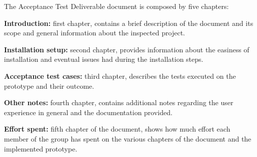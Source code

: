 The Acceptance Test Deliverable document is composed by five chapters:

\textbf{Introduction:} first chapter, contains a brief description of the document and its scope and general information about the inspected project.

\textbf{Installation setup:} second chapter, provides information about the easiness of installation and eventual issues had during the installation steps.

\textbf{Acceptance test cases:} third chapter, describes the tests executed on the prototype and their outcome.

\textbf{Other notes:} fourth chapter, contains additional notes regarding the user experience in general and the documentation provided.

\textbf{Effort spent:} fifth chapter of the document, shows how much effort each member of the group has spent on the various chapters of the document and the implemented prototype.